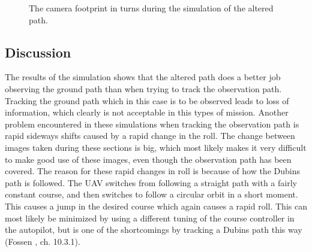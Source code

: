
\begin{figure}[]
    \centering
    \caption{The camera footprint in turns during the simulation of the altered path.}
	\label{fig:both_camera_turns}
\end{figure}


\subsection{Discussion}

The results of the simulation shows that the altered path does a better job observing the ground path than when trying to track the observation path. Tracking the ground path which in this case is to be observed leads to loss of information, which clearly is not acceptable in this types of mission. Another problem encountered in these simulations when tracking the observation path is rapid sideways shifts caused by a rapid change in the roll. The change between images taken during these sections is big, which most likely makes it very difficult to make good use of these images, even though the observation path has been covered. The reason for these rapid changes in roll is because of how the Dubins path is followed. The UAV switches from following a straight path with a fairly constant course, and then switches to follow a circular orbit in a short moment. This causes a jump in the desired course which again causes a rapid roll. This can most likely be minimized by using a different tuning of the course controller in the autopilot, but is one of the shortcomings by tracking a Dubins path this way (Fossen \cite{fartoyFOSSEN}, ch. 10.3.1). 

